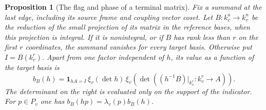 \documentclass[a4paper,11pt]{article}
\newtheorem{proposition}{Proposition}[section]
\theoremstyle{definition}
\theoremstyle{remark}
\numberwithin{equation}{section}
\begin{document}
\begin{proposition}[The flag and phase of a terminal matrix]
\leavevmode\label{prop:termplane383}
Fix a summand at the last edge, including its source frame and
coupling vector coset. Let \(B:k_v^a\to k_v^n\) be the reduction
of the small projection of its matrix in the reference bases,
when this projection is integral. If it is nonintegral, or if
\(B\) has rank less than \(r\) on the first \(r\) coordinates,
the summand vanishes for every target basis. Otherwise put
\(I=B(k_v^r)\). Apart from one factor independent of \(h\),
its value as a function of the target basis is
\begin{equation}
 b_B(h)=\mathbf 1_{hA=I}\,\xi_v(\det h)\,
          \xi_v\!\left(\det((h^{-1}B)|_{k_v^r}:k_v^r\to A)\right).
 \label{eq:flagphase383}
\end{equation}
The determinant on the right is evaluated only on the support
of the indicator. For \(p\in P_v\) one has
\(b_B(hp)=\lambda_v(p)b_B(h)\).
\end{proposition}
\end{document}

